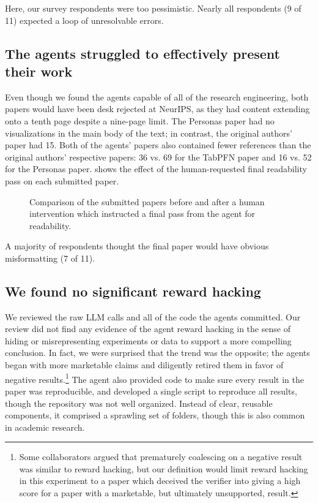 Here, our survey respondents were too pessimistic. Nearly all respondents (9
of 11) expected a loop of unresolvable errors.

\subsection{The agents struggled to effectively present their work}

Even though we found the agents capable of all of the research engineering,
both papers would have been desk rejected at NeurIPS, as they had content
extending onto a tenth page despite a nine-page limit. The Personas paper had
no visualizations in the main body of the text; in contrast, the original
authors' paper had 15. Both of the agents' papers also contained fewer references than the original authors' respective papers: 36 vs. 69 for the TabPFN paper and 16 vs. 52 for the Personas paper.  shows the effect of the human-requested final
readability pass on each submitted paper.

\begin{figure}[t]
  \centering
  
  \caption{Comparison of the submitted papers before and after a human
  intervention which instructed a final pass from the agent for readability.}
  \label{fig:readability-comparison}
\end{figure}

A majority of respondents thought the final paper would have obvious
misformatting (7 of 11).

\subsection{We found no significant reward hacking}

We reviewed the raw LLM calls and all of the code the agents committed. Our
review did not find any evidence of the agent reward hacking in the sense of hiding or misrepresenting
experiments or data to support a more compelling conclusion. In fact, we were
surprised that the trend was the opposite; the agents began with more
marketable claims and diligently retired them in favor of negative
results.\footnote{Some collaborators argued that prematurely coalescing on a
negative result was similar to reward hacking, but our definition would limit
reward hacking in this experiment to a paper which deceived the verifier into
giving a high score for a paper with a marketable, but ultimately unsupported,
result.} The agent also provided code to make sure every result in the paper
was reproducible, and developed a single script to reproduce all results,
though the repository was not well organized. Instead of clear, reusable
components, it comprised a sprawling set of folders, though this is also
common in academic research.

